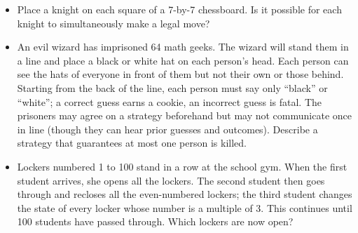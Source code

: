 \documentclass[12pt]{article}
\begin{document}
\begin{itemize}
  \item Place a knight on each square of a 7-by-7 chessboard. Is it possible for each knight to simultaneously make a legal move?

  \item  An evil wizard has imprisoned 64 math geeks. The wizard will stand them in a line and place a black or white hat on each person's head. Each person can see the hats of everyone in front of them but not their own or those behind. Starting from the back of the line, each person must say only ``black'' or ``white''; a correct guess earns a cookie, an incorrect guess is fatal. The prisoners may agree on a strategy beforehand but may not communicate once in line (though they can hear prior guesses and outcomes). Describe a strategy that guarantees at most one person is killed.
  
  \item Lockers numbered 1 to 100 stand in a row at the school gym. When the first student arrives, she opens all the lockers. The second student then goes through and recloses all the even-numbered lockers; the third student changes the state of every locker whose number is a multiple of 3. This continues until 100 students have passed through. Which lockers are now open?
\end{itemize}
\end{document}
